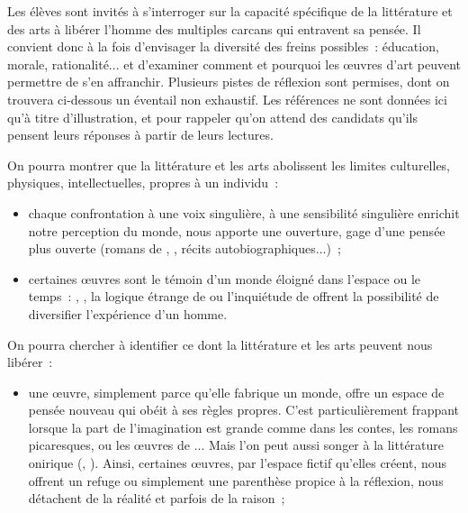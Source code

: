 		{Les élèves sont invités à s'interroger sur la capacité spécifique de la
littérature et des arts à libérer l'homme des multiples carcans qui entravent sa
pensée. Il convient donc à la fois d'envisager la diversité des freins possibles~:
éducation, morale, rationalité... et d'examiner comment et pourquoi les œuvres
d'art peuvent permettre de s'en affranchir. Plusieurs pistes de réflexion sont
permises, dont on trouvera ci-dessous un éventail non exhaustif. Les références ne
sont données ici qu'à titre d'illustration, et pour rappeler qu'on attend des candidats qu'ils pensent leurs réponses à partir de leurs lectures.

On pourra montrer que la littérature et les arts abolissent les limites
culturelles, physiques, intellectuelles, propres à un individu~:

\begin{itemize}
\item chaque confrontation à une voix singulière, à une sensibilité singulière
enrichit notre perception du monde, nous apporte une ouverture, gage d'une pensée 
plus ouverte (romans de , , récits autobiographiques...)~;

\item certaines œuvres sont le témoin d'un monde éloigné dans l'espace ou le
temps~: , ,
la logique étrange de  ou l'inquiétude de  offrent la possibilité de
diversifier l'expérience d'un homme.
\end{itemize}

On pourra chercher à identifier ce dont la littérature et les arts peuvent nous
libérer~:

\begin{itemize}
\item une œuvre, simplement parce qu'elle fabrique un monde, offre un espace de pensée
nouveau qui obéit à ses règles propres. C'est particulièrement frappant lorsque la part
de l'imagination est grande comme dans les contes, les romans picaresques, ou les
œuvres de ... Mais l'on peut aussi songer à la littérature onirique (, ). Ainsi, certaines œuvres, par l'espace fictif qu'elles créent, nous offrent
un refuge ou simplement une parenthèse propice à la réflexion, nous détachent de la
réalité et parfois de la raison~;


\end{itemize}}

